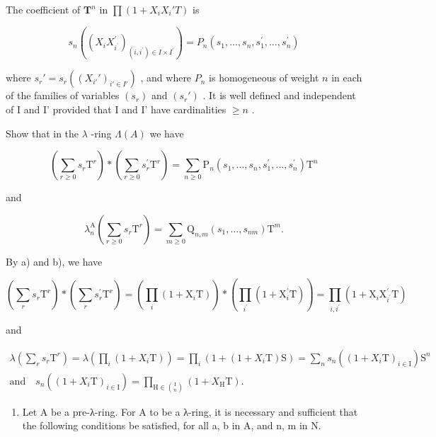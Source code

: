 The coefficient of \(\mathbf{T}^n\) in \(\prod (1 + X_iX_i'T)\) is

\[
s _ {n} \left(\left(X _ {i} X _ {i ^ {\prime}} ^ {\prime}\right) _ {(i, i ^ {\prime}) \in I \times I ^ {\prime}}\right) = P _ {n} \left(s _ {1}, \dots , s _ {n}, s _ {1} ^ {\prime}, \dots , s _ {n} ^ {\prime}\right)
\]

where \(s_r' = s_r((X_{i'}')_{i'\in I'})\) , and where \(P_n\) is homogeneous of weight \(n\) in each of the families of variables \((s_r)\) and \((s_r')\) . It is well defined and independent of I and I' provided that I and I' have cardinalities \(\geqslant n\) .

Show that in the \(\lambda\) -ring \(\Lambda(A)\) we have

\[
\left(\sum_ {r \geqslant 0} s _ {r} \mathrm{T} ^ {r}\right) * \left(\sum_ {r \geqslant 0} s _ {r} ^ {\prime} \mathrm{T} ^ {r}\right) = \sum_ {n \geqslant 0} \mathrm{P} _ {n} (s _ {1},..., s _ {n}, s _ {1} ^ {\prime},..., s _ {n} ^ {\prime}) \mathrm{T} ^ {n}
\]

and

\[
\lambda_ {n} ^ {\mathrm{A}} \left(\sum_ {r \geqslant 0} s _ {r} \mathrm{T} ^ {r}\right) = \sum_ {m \geqslant 0} \mathrm{Q} _ {n, m} \left(s _ {1}, \dots , s _ {n m}\right) \mathrm{T} ^ {m}.
\]

By a) and b), we have

\[
\left(\sum_ {r} s _ {r} \mathrm{T} ^ {r}\right) * \left(\sum_ {r} s _ {r} ^ {\prime} \mathrm{T} ^ {r}\right) = \left(\prod_ {i} \left(1 + \mathrm{X} _ {i} \mathrm{T}\right)\right) * \left(\prod_ {i ^ {\prime}} \left(1 + \mathrm{X} _ {i} ^ {\prime} \mathrm{T}\right)\right) = \prod_ {i, i ^ {\prime}} \left(1 + \mathrm{X} _ {i} \mathrm{X} _ {i ^ {\prime}} ^ {\prime} \mathrm{T}\right)
\]

and

\[
\begin{array}{l} \lambda (\sum_ {r} s _ {r} \mathrm{T} ^ {r}) = \lambda (\prod _{i} (1 + X _ {i} \mathrm{T})) = \prod _{i} (1 + (1 + X _ {i} \mathrm{T}) \mathrm{S}) = \sum _{n} s _ {n} ((1 + X _ {i} \mathrm{T}) _ {i \in \mathrm{I}}) \mathrm{S} ^ {n} \\ \text{and}\quad s _ {n} ((1 + X _ {i} \mathrm{T}) _ {i \in \mathrm{I}}) = \prod _{\mathrm{H} \in \binom {\mathrm{I}} {n}} (1 + X _{\mathrm{H}} \mathrm{T}) . \end{array}
\]

\begin{enumerate}
\def\labelenumi{\alph{enumi})}
\setcounter{enumi}{4}
\tightlist
\item
  Let A be a pre-λ-ring. For A to be a λ-ring, it is necessary and sufficient that the following conditions be satisfied, for all a, b in A, and n, m in N.
\end{enumerate}

